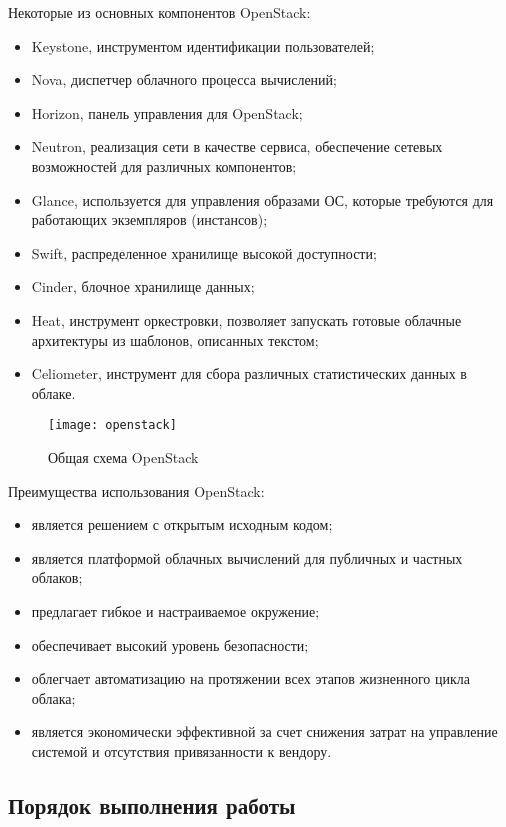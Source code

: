 Некоторые из основных компонентов OpenStack:
\begin{itemize}
    \item Keystone, инструментом идентификации пользователей;
    \item Nova, диспетчер облачного процесса вычислений;
    \item Horizon, панель управления для OpenStack;
    \item Neutron, реализация сети в качестве сервиса, обеспечение сетевых возможностей для различных компонентов;
    \item Glance, используется для управления образами ОС, которые требуются для работающих экземпляров (инстансов);
    \item Swift, распределенное хранилище высокой доступности;
    \item Cinder, блочное хранилище данных;
    \item Heat, инструмент оркестровки, позволяет запускать готовые облачные архитектуры из шаблонов, описанных текстом;
    \item Celiometer, инструмент для сбора различных статистических данных в облаке.
\end{itemize}

\clearpage

\begin{figure}[ht]
    \centering
    \texttt{[image: openstack]}
    \caption{Общая схема OpenStack}\label{pic:openstack}
\end{figure}

Преимущества использования OpenStack:
\begin{itemize}
    \item является решением с открытым исходным кодом;
    \item является платформой облачных вычислений для публичных и частных облаков;
    \item предлагает гибкое и настраиваемое окружение;
    \item обеспечивает высокий уровень безопасности;
    \item облегчает автоматизацию на протяжении всех этапов жизненного цикла облака;
    \item является экономически эффективной за счет снижения затрат на управление системой и отсутствия привязанности к вендору.
\end{itemize}

\subsection{Порядок выполнения работы}

